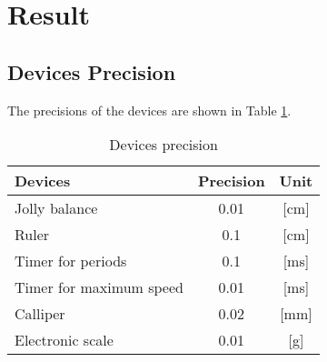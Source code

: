 \section{Result}

\subsection{Devices Precision}
The precisions of the devices are shown in Table \ref{precision}.
\begin{table}
\centering
\begin{tabular}{|l|c|c|}
\hline
Devices & Precision & Unit\\ \hline
Jolly balance & 0.01 & [cm]\\ \hline
Ruler & 0.1 & [cm]\\ \hline
Timer for periods & 0.1 & [ms]\\ \hline
Timer for maximum speed & 0.01 & [ms]\\ \hline
Calliper & 0.02 & [mm]\\ \hline
Electronic scale & 0.01 & [g]\\ \hline
\end{tabular}
\caption{Devices precision}\label{precision}
\end{table}